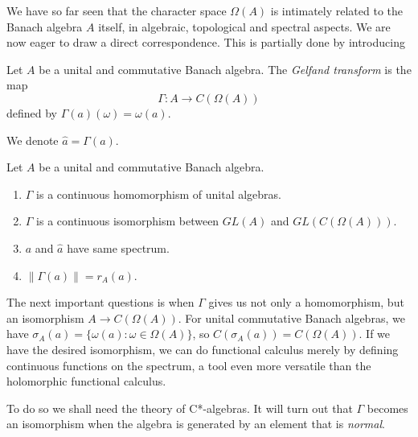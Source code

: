 We have so far seen that the character space $\Omega(A)$ is intimately related to the Banach algebra $A$ itself, in algebraic, topological and spectral aspects. We are now eager to draw a direct correspondence. This is partially done by introducing

\begin{definition}
	\label{defn:Gelftransform}
	Let $A$ be a unital and commutative Banach algebra. The \textit{Gelfand transform} is the map
	\[
		\Gamma: A \to C(\Omega(A))
	\] 
	defined by $\Gamma(a)(\omega) = \omega(a)$. 

	We denote $\hat{a}  = \Gamma(a)$.
\end{definition}

\begin{theorem}
	\label{thm:GelfandProp}
	Let $A $ be a unital and commutative Banach algebra.
	\begin{enumerate}
		\item $\Gamma$ is a continuous homomorphism of unital algebras.
		\item $\Gamma$ is a continuous isomorphism between $GL(A)$ and $GL(C(\Omega(A)))$.
		\item $a$ and $\hat{a}$ have same spectrum.
		\item $\|\Gamma(a)\| = r_A(a)$.
	\end{enumerate}
\end{theorem}

The next important questions is when $\Gamma$ gives us not only a homomorphism, but an isomorphism $A \to C(\Omega(A))$. For unital commutative Banach algebras, we have $\sigma_A(a) = \{\omega(a): \omega \in \Omega(A)\} $, so $C(\sigma_A(a)) = C(\Omega(A))$. If we have the desired isomorphism, we can do functional calculus merely by defining continuous functions on the spectrum, a tool even more versatile than the holomorphic functional calculus.

To do so we shall need the theory of C*-algebras. It will turn out that $\Gamma$ becomes an isomorphism when the algebra is generated by an element that is \textit{normal}.






